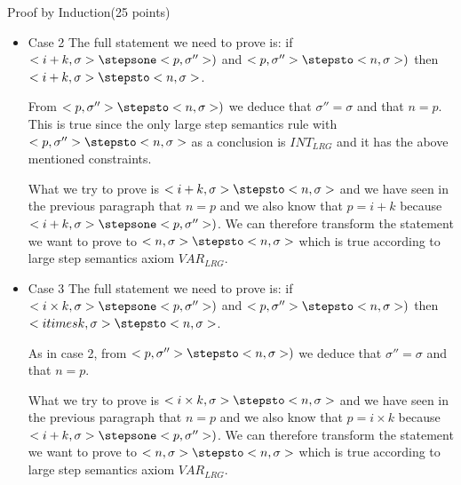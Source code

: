 \documentclass{article}
\begin{document}
\begin{question}{Proof by Induction}{(25 points)}
\begin{subquestion}
\begin{itemize}
The conclusion that we try to prove which is $<x, \sigma> \stepsto <n, \sigma>$, can only be inferred by the large step semantics rule  $VAR_{LRG}$ and it requires that $\sigma = \sigma'$ which is the case as we have seen in the previous two paragraphs, and it requires that $\sigma(x) = n$ which is true as shown in the previous paragraph.




\item Case 2 The full statement we need to prove is: if $<i+k, \sigma> \stepsone <p, \sigma''>)$ and $<p, \sigma''> \stepsto <n, \sigma>)$ then $<i+k, \sigma> \stepsto <n, \sigma>$.

From $<p, \sigma''> \stepsto <n, \sigma>)$ we deduce that $\sigma'' = \sigma$ and that $n = p$. This is true since the only large step semantics rule with $<p, \sigma''> \stepsto <n, \sigma>$ as a conclusion is $INT_{LRG}$ and it has the above mentioned constraints.

What we try to prove is $<i+k, \sigma> \stepsto <n, \sigma>$ and we have seen in the previous paragraph that $n = p$ and we also know that $p = i + k$ because $<i+k, \sigma> \stepsone <p, \sigma''>)$. We can therefore transform the statement we want to prove to $<n, \sigma> \stepsto <n, \sigma>$ which is true according to large step semantics axiom $VAR_{LRG}$.

\item Case 3 The full statement we need to prove is: if $<i \times k, \sigma> \stepsone <p, \sigma''>)$ and $<p, \sigma''> \stepsto <n, \sigma>)$ then $<i times k, \sigma> \stepsto <n, \sigma>$.

As in case 2, from $<p, \sigma''> \stepsto <n, \sigma>)$ we deduce that $\sigma'' = \sigma$ and that $n = p$. 

What we try to prove is $<i \times k, \sigma> \stepsto <n, \sigma>$ and we have seen in the previous paragraph that $n = p$ and we also know that $p = i \times k$ because $<i+k, \sigma> \stepsone <p, \sigma''>)$. We can therefore transform the statement we want to prove to $<n, \sigma> \stepsto <n, \sigma>$ which is true according to large step semantics axiom $VAR_{LRG}$.



\end{itemize}
\end{subquestion}
\end{question}
\end{document}
